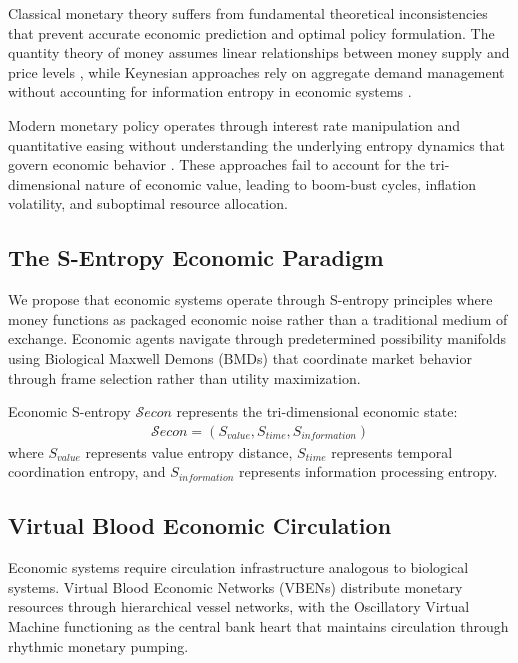 Classical monetary theory suffers from fundamental theoretical inconsistencies that prevent accurate economic prediction and optimal policy formulation. The quantity theory of money assumes linear relationships between money supply and price levels \cite{friedman1963monetary}, while Keynesian approaches rely on aggregate demand management without accounting for information entropy in economic systems \cite{keynes1936general}.

Modern monetary policy operates through interest rate manipulation and quantitative easing without understanding the underlying entropy dynamics that govern economic behavior \cite{bernanke2004great}. These approaches fail to account for the tri-dimensional nature of economic value, leading to boom-bust cycles, inflation volatility, and suboptimal resource allocation.

\subsection{The S-Entropy Economic Paradigm}

We propose that economic systems operate through S-entropy principles where money functions as packaged economic noise rather than a traditional medium of exchange. Economic agents navigate through predetermined possibility manifolds using Biological Maxwell Demons (BMDs) that coordinate market behavior through frame selection rather than utility maximization.

\begin{definition}
Economic S-entropy $\mathcal{S}{econ}$ represents the tri-dimensional economic state:
\begin{align}
\mathcal{S}{econ} = (S_{value}, S_{time}, S_{information})
\end{align}
where $S_{value}$ represents value entropy distance, $S_{time}$ represents temporal coordination entropy, and $S_{information}$ represents information processing entropy.
\end{definition}

\subsection{Virtual Blood Economic Circulation}

Economic systems require circulation infrastructure analogous to biological systems. Virtual Blood Economic Networks (VBENs) distribute monetary resources through hierarchical vessel networks, with the Oscillatory Virtual Machine functioning as the central bank heart that maintains circulation through rhythmic monetary pumping.

